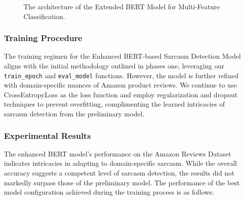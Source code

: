 \documentclass[10pt,twocolumn,letterpaper]{article}
\begin{document}

\begin{figure}[ht]
    \centering
    \caption{The architecture of the Extended BERT Model for Multi-Feature Classification.}
    \label{fig:model_architecture}
\end{figure}

\subsubsection{Training Procedure}
The training regimen for the Enhanced BERT-based Sarcasm Detection Model aligns with the initial methodology outlined in phases one, leveraging our \texttt{train\_epoch} and \texttt{eval\_model} functions. However, the model is further refined with domain-specific nuances of Amazon product reviews. We continue to use CrossEntropyLoss as the loss function and employ regularization and dropout techniques to prevent overfitting, complimenting the learned intricacies of sarcasm detection from the preliminary model.

\subsubsection{Experimental Results}
\label{sec:experimental_results}

The enhanced BERT model's performance on the Amazon Reviews Dataset indicates intricacies in adapting to domain-specific sarcasm. While the overall accuracy suggests a competent level of sarcasm detection, the results did not markedly surpass those of the preliminary model. The performance of the best model configuration achieved during the training process is as follows:
\end{document}
